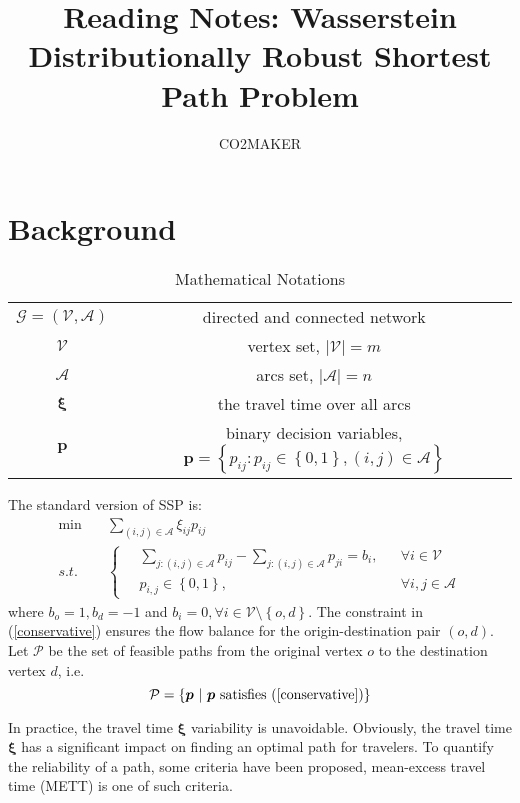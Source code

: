 \documentclass{article}
\title{Reading Notes: Wasserstein Distributionally Robust Shortest Path Problem}
\author{CO2MAKER}
\begin{document}
\maketitle 
\allowdisplaybreaks[4]

\section{Background} 

\begin{table}[htbp]
	\caption{Mathematical Notations}
	\centering
	\begin{tabular}{cc}
		\toprule
		$\mathcal{G} = (\mathcal{V}, \mathcal{A})$ & directed and connected network \\
		$\mathcal{V}$ & vertex set, $|\mathcal{V}| = m$ \\
		$\mathcal{A}$ & arcs set, $|\mathcal{A}| = n$ \\
		$\bm{\xi}$      &  the travel time over all arcs \\
		$\bm{p}$        & binary decision variables, $\bm{p} = \left\{ p_{ij} : p_{ij} \in \left\{0, 1\right\}, (i, j) \in \mathcal{A} \right\}$ \\
		\bottomrule
	\end{tabular}
\end{table}

\noindent The standard version of SSP is:
\begin{align}
	\min \quad & \sum_{(i, j) \in \mathcal{A}} \xi_{ij} p_{ij} \\
	s.t. \quad & \left\{ 
	\begin{aligned} \label{conservative}
		\ & \sum_{j:(i, j) \in \mathcal{A}} p_{ij} - \sum_{j:(i, j) \in \mathcal{A}} p_{ji} = b_i, && \forall i \in \mathcal{V} \\
		& p_{i, j} \in \left\{0, 1\right\}, && \forall i, j \in \mathcal{A}
	\end{aligned} \right. 
\end{align}
where $b_o = 1, b_d = -1$ and $b_i = 0, \forall i \in \mathcal{V} \setminus \left\{o, d\right\}$. The constraint in (\ref{conservative}) ensures the flow balance for the origin-destination pair $(o, d)$. Let $\mathcal{P}$ be the set of feasible paths from the original vertex $o$ to the destination vertex $d$, i.e. 
\begin{equation}
	\mathcal{P} = \left\{\bm{p} \ | \ \bm{p} \ \text{satisfies} \ (\ref{conservative})\right\}
\end{equation}

In practice, the travel time $\bm{\xi}$ variability is unavoidable. Obviously, the travel time $\bm{\xi}$ has a significant impact on finding an optimal path for travelers.  To quantify the reliability of a path, some criteria have been proposed, mean-excess travel time (METT) is one of such criteria.
\end{document}

